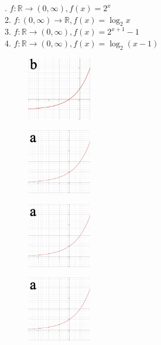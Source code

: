 \documentclass[a4paper, 12pt]{scrartcl}
\theoremstyle{plain}
\begin{document}
\begin{paracol}{2}
    . \( f: \mathbb{R} \rightarrow ( 0, \infty ), f(x) = 2^x \) \\
    2. \( f: ( 0, \infty ) \rightarrow \mathbb{R}, f(x) = \log_2{x} \) \\
    3. \( f: \mathbb{R} \rightarrow ( 0, \infty ), f(x) = 2^{x+1} - 1 \) \\
    4. \( f: \mathbb{R} \rightarrow ( 0, \infty ), f(x) = \log_2({x - 1}) \)
\switchcolumn

\end{paracol}
    
\begin{paracol}{4}
    \begin{figure}[H]
        \hbox{\includegraphics[width=0.25\textwidth]{grafic2.jpg}}
    \end{figure}
    \switchcolumn
    \begin{figure}[H]
        \hbox{\includegraphics[width=0.25\textwidth]{grafic1.jpg}}
    \end{figure}
    \switchcolumn
    \begin{figure}[H]
        \hbox{\includegraphics[width=0.25\textwidth]{grafic1.jpg}}
    \end{figure}
    \switchcolumn
    \begin{figure}[H]
        \hbox{\includegraphics[width=0.25\textwidth]{grafic1.jpg}}
    \end{figure}
\end{paracol}
\end{document}
